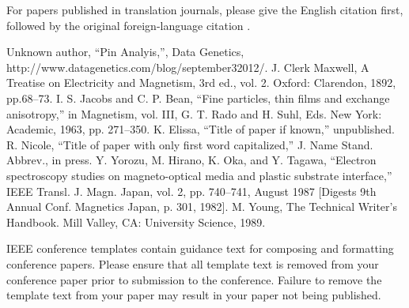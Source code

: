\documentclass[conference]{IEEEtran}
\begin{document}
For papers published in translation journals, please give the English 
citation first, followed by the original foreign-language citation \cite{b6}.

\begin{thebibliography}{00}
 Unknown author, ``Pin Analyis,'', Data Genetics, http://www.datagenetics.com/blog/september32012/.
 J. Clerk Maxwell, A Treatise on Electricity and Magnetism, 3rd ed., vol. 2. Oxford: Clarendon, 1892, pp.68--73.
 I. S. Jacobs and C. P. Bean, ``Fine particles, thin films and exchange anisotropy,'' in Magnetism, vol. III, G. T. Rado and H. Suhl, Eds. New York: Academic, 1963, pp. 271--350.
 K. Elissa, ``Title of paper if known,'' unpublished.
 R. Nicole, ``Title of paper with only first word capitalized,'' J. Name Stand. Abbrev., in press.
 Y. Yorozu, M. Hirano, K. Oka, and Y. Tagawa, ``Electron spectroscopy studies on magneto-optical media and plastic substrate interface,'' IEEE Transl. J. Magn. Japan, vol. 2, pp. 740--741, August 1987 [Digests 9th Annual Conf. Magnetics Japan, p. 301, 1982].
 M. Young, The Technical Writer's Handbook. Mill Valley, CA: University Science, 1989.
\end{thebibliography}
\vspace{12pt}
\color{red}
IEEE conference templates contain guidance text for composing and formatting conference papers. Please ensure that all template text is removed from your conference paper prior to submission to the conference. Failure to remove the template text from your paper may result in your paper not being published.
\end{document}
